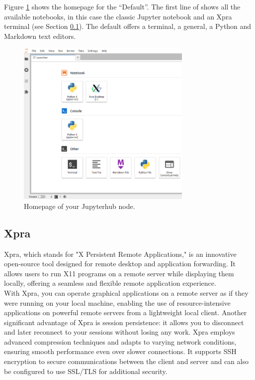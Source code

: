 Figure \ref{homepage} shows the homepage for the \uninuvola  ``Default''. The first line of shows all the available notebooks, in this case the classic Jupyter notebook and an Xpra terminal (see Section \ref{xpra}). The default offers a terminal, a general, a Python and Markdown text editors. \\
\begin{figure}[htbp]
    \centering
    \includegraphics[width=0.75\textwidth]{figures/homepage.png}
    \caption{Homepage of your Jupyterhub node. }
    \label{homepage}
\end{figure}


\subsection{Xpra}\label{xpra}

Xpra,\cite{Xpra} which stands for "X Persistent Remote Applications," is an innovative open-source tool designed for remote desktop and application forwarding. It allows users to run X11 programs on a remote server while displaying them locally, offering a seamless and flexible remote application experience.\\

With Xpra, you can operate graphical applications on a remote server as if they were running on your local machine, enabling the use of resource-intensive applications on powerful remote servers from a lightweight local client. Another significant advantage of Xpra is session persistence: it allows you to disconnect and later reconnect to your sessions without losing any work. Xpra employs advanced compression techniques and adapts to varying network conditions, ensuring smooth performance even over slower connections. It supports SSH encryption to secure communications between the client and server and can also be configured to use SSL/TLS for additional security. \\

